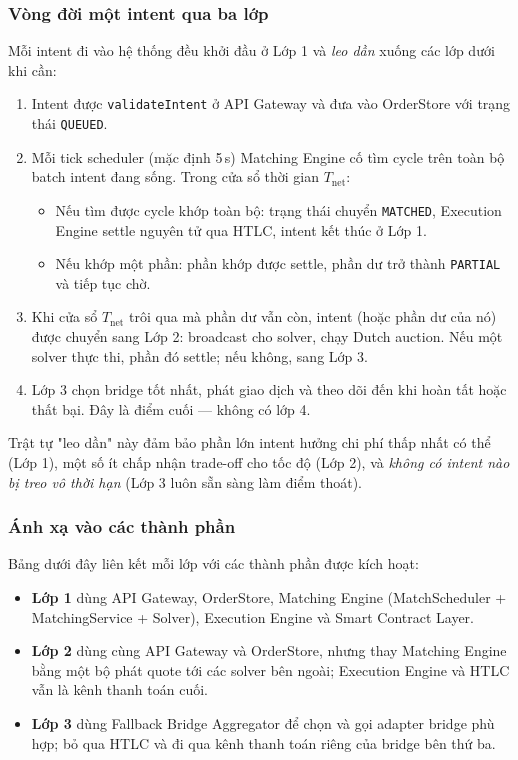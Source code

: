 \subsubsection*{Vòng đời một intent qua ba lớp}

Mỗi intent đi vào hệ thống đều khởi đầu ở Lớp 1 và \emph{leo dần}
xuống các lớp dưới khi cần:

\begin{enumerate}
  \item Intent được \texttt{validateIntent} ở API Gateway và đưa vào
    OrderStore với trạng thái \texttt{QUEUED}.
  \item Mỗi tick scheduler (mặc định 5\,s) Matching Engine cố tìm
    cycle trên toàn bộ batch intent đang sống. Trong cửa sổ thời gian
    $T_{\text{net}}$:
    \begin{itemize}
      \item Nếu tìm được cycle khớp toàn bộ: trạng thái chuyển
        \texttt{MATCHED}, Execution Engine settle nguyên tử qua HTLC,
        intent kết thúc ở Lớp 1.
      \item Nếu khớp một phần: phần khớp được settle, phần dư trở
        thành \texttt{PARTIAL} và tiếp tục chờ.
    \end{itemize}
  \item Khi cửa sổ $T_{\text{net}}$ trôi qua mà phần dư vẫn còn,
    intent (hoặc phần dư của nó) được chuyển sang Lớp 2: broadcast
    cho solver, chạy Dutch auction. Nếu một solver thực thi, phần
    đó settle; nếu không, sang Lớp 3.
  \item Lớp 3 chọn bridge tốt nhất, phát giao dịch và theo dõi đến
    khi hoàn tất hoặc thất bại. Đây là điểm cuối — không có lớp 4.
\end{enumerate}

Trật tự "leo dần" này đảm bảo phần lớn intent hưởng chi phí thấp
nhất có thể (Lớp 1), một số ít chấp nhận trade-off cho tốc độ (Lớp
2), và \emph{không có intent nào bị treo vô thời hạn} (Lớp 3 luôn
sẵn sàng làm điểm thoát).

\subsubsection*{Ánh xạ vào các thành phần}

Bảng dưới đây liên kết mỗi lớp với các thành phần được kích hoạt:

\begin{itemize}
  \item \textbf{Lớp 1} dùng API Gateway, OrderStore, Matching Engine
    (MatchScheduler + MatchingService + Solver), Execution Engine và
    Smart Contract Layer.
  \item \textbf{Lớp 2} dùng cùng API Gateway và OrderStore, nhưng
    thay Matching Engine bằng một bộ phát quote tới các solver bên
    ngoài; Execution Engine và HTLC vẫn là kênh thanh toán cuối.
  \item \textbf{Lớp 3} dùng Fallback Bridge Aggregator để chọn và
    gọi adapter bridge phù hợp; bỏ qua HTLC và đi qua kênh thanh
    toán riêng của bridge bên thứ ba.
\end{itemize}

